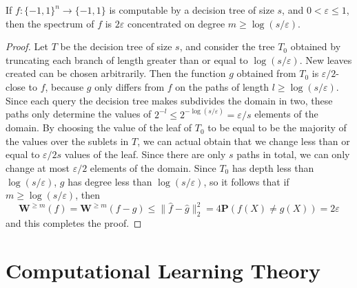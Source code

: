 \begin{theorem}
    If $f: \{ -1, 1 \}^n \to \{ -1, 1 \}$ is computable by a decision tree of size $s$, and $0 < \varepsilon \leq 1$, then the spectrum of $f$ is $2\varepsilon$ concentrated on degree $m \geq \log(s/\varepsilon)$.
\end{theorem}
\begin{proof}
    Let $T$ be the decision tree of size $s$, and consider the tree $T_0$ obtained by truncating each branch of length greater than or equal to $\log(s/\varepsilon)$. New leaves created can be chosen arbitrarily. Then the function $g$ obtained from $T_0$ is $\varepsilon/2$-close to $f$, because $g$ only differs from $f$ on the paths of length $l \geq \log(s/\varepsilon)$. Since each query the decision tree makes subdivides the domain in two, these paths only determine the values of $2^{-l} \leq 2^{-\log(s/\varepsilon)} = \varepsilon/s$ elements of the domain. By choosing the value of the leaf of $T_0$ to be equal to be the majority of the values over the sublets in $T$, we can actual obtain that we change less than or equal to $\varepsilon/2s$ values of the leaf. Since there are only $s$ paths in total, we can only change at most $\varepsilon/2$ elements of the domain. Since $T_0$ has depth less than $\log(s/\varepsilon)$, $g$ has degree less than $\log(s/\varepsilon)$, so it follows that if $m \geq \log(s/\varepsilon)$, then
    \[ \mathbf{W}^{\geq m}(f) = \mathbf{W}^{\geq m}(f - g) \leq \| \widehat{f} - \widehat{g} \|_2^2 = 4 \mathbf{P}(f(X) \neq g(X)) = 2\varepsilon \]
    and this completes the proof.
\end{proof}




\section{Computational Learning Theory}


